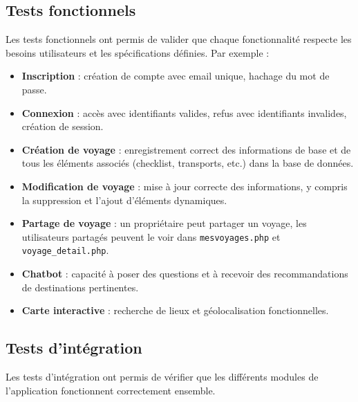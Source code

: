 \documentclass[a4paper,12pt]{article}
\begin{document}
\subsection{Tests fonctionnels}
Les tests fonctionnels ont permis de valider que chaque fonctionnalité respecte les besoins utilisateurs et les spécifications définies. Par exemple :
\begin{itemize}
    \item \textbf{Inscription} : création de compte avec email unique, hachage du mot de passe.
    \item \textbf{Connexion} : accès avec identifiants valides, refus avec identifiants invalides, création de session.
    \item \textbf{Création de voyage} : enregistrement correct des informations de base et de tous les éléments associés (checklist, transports, etc.) dans la base de données.
    \item \textbf{Modification de voyage} : mise à jour correcte des informations, y compris la suppression et l'ajout d'éléments dynamiques.
    \item \textbf{Partage de voyage} : un propriétaire peut partager un voyage, les utilisateurs partagés peuvent le voir dans \texttt{mesvoyages.php} et \texttt{voyage\_detail.php}.
    \item \textbf{Chatbot} : capacité à poser des questions et à recevoir des recommandations de destinations pertinentes.
    \item \textbf{Carte interactive} : recherche de lieux et géolocalisation fonctionnelles.
\end{itemize}

\subsection{Tests d'intégration}
Les tests d'intégration ont permis de vérifier que les différents modules de l'application fonctionnent correctement ensemble.
\end{document}
